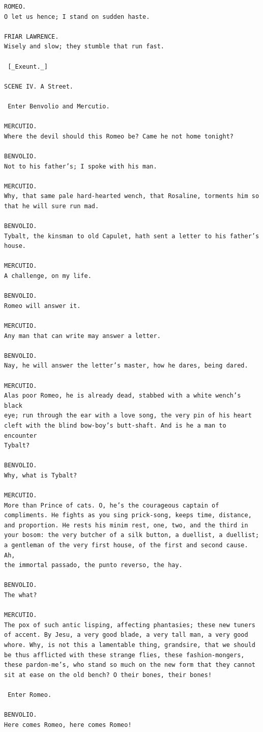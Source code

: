 \documentclass{article}
\begin{document}
\begin{verbatim}
ROMEO.
O let us hence; I stand on sudden haste.

FRIAR LAWRENCE.
Wisely and slow; they stumble that run fast.

 [_Exeunt._]

SCENE IV. A Street.

 Enter Benvolio and Mercutio.

MERCUTIO.
Where the devil should this Romeo be? Came he not home tonight?

BENVOLIO.
Not to his father’s; I spoke with his man.

MERCUTIO.
Why, that same pale hard-hearted wench, that Rosaline, torments him so
that he will sure run mad.

BENVOLIO.
Tybalt, the kinsman to old Capulet, hath sent a letter to his father’s
house.

MERCUTIO.
A challenge, on my life.

BENVOLIO.
Romeo will answer it.

MERCUTIO.
Any man that can write may answer a letter.

BENVOLIO.
Nay, he will answer the letter’s master, how he dares, being dared.

MERCUTIO.
Alas poor Romeo, he is already dead, stabbed with a white wench’s black
eye; run through the ear with a love song, the very pin of his heart
cleft with the blind bow-boy’s butt-shaft. And is he a man to encounter
Tybalt?

BENVOLIO.
Why, what is Tybalt?

MERCUTIO.
More than Prince of cats. O, he’s the courageous captain of
compliments. He fights as you sing prick-song, keeps time, distance,
and proportion. He rests his minim rest, one, two, and the third in
your bosom: the very butcher of a silk button, a duellist, a duellist;
a gentleman of the very first house, of the first and second cause. Ah,
the immortal passado, the punto reverso, the hay.

BENVOLIO.
The what?

MERCUTIO.
The pox of such antic lisping, affecting phantasies; these new tuners
of accent. By Jesu, a very good blade, a very tall man, a very good
whore. Why, is not this a lamentable thing, grandsire, that we should
be thus afflicted with these strange flies, these fashion-mongers,
these pardon-me’s, who stand so much on the new form that they cannot
sit at ease on the old bench? O their bones, their bones!

 Enter Romeo.

BENVOLIO.
Here comes Romeo, here comes Romeo!


\end{verbatim}
\end{document}
